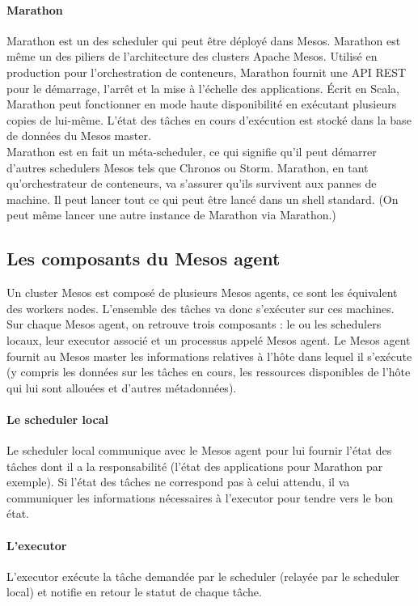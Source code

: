 \documentclass[11pt,fleqn]{book} %
\begin{document}
\paragraph*{Marathon}
Marathon est un des scheduler qui peut être déployé dans Mesos. Marathon est même un des piliers de l'architecture des clusters Apache Mesos. Utilisé en production pour l'orchestration de conteneurs, Marathon fournit une API REST pour le démarrage, l'arrêt et la mise à l'échelle des applications. Écrit en Scala, Marathon peut fonctionner en mode haute disponibilité en exécutant plusieurs copies de lui-même. L'état des tâches en cours d'exécution est stocké dans la base de données du Mesos master.\\

Marathon est en fait un méta-scheduler, ce qui signifie qu'il peut démarrer d'autres schedulers Mesos tels que Chronos ou Storm. Marathon, en tant qu'orchestrateur de conteneurs, va s'assurer qu'ils survivent aux pannes de machine. Il peut lancer tout ce qui peut être lancé dans un shell standard. (On peut même lancer une autre instance de Marathon via Marathon.)

\subsection*{Les composants du Mesos agent}
Un cluster Mesos est composé de plusieurs Mesos agents, ce sont les équivalent des workers nodes. L'ensemble des tâches va donc s'exécuter sur ces machines. Sur chaque Mesos agent, on retrouve trois composants : le ou les schedulers locaux, leur executor associé et un processus appelé Mesos agent. Le Mesos agent fournit au Mesos master les informations relatives à l'hôte dans lequel il s'exécute (y compris les données sur les tâches en cours, les ressources disponibles de l'hôte qui lui sont allouées et d'autres métadonnées).

\paragraph*{Le scheduler local}
Le scheduler local communique avec le Mesos agent pour lui fournir l'état des tâches dont il a la responsabilité (l'état des applications pour Marathon par exemple). Si l'état des tâches ne correspond pas à celui attendu, il va communiquer les informations nécessaires à l'executor pour tendre vers le bon état.

\paragraph*{L'executor}
L'executor exécute la tâche demandée par le scheduler (relayée par le scheduler local) et notifie en retour le statut de chaque tâche.
\end{document}
